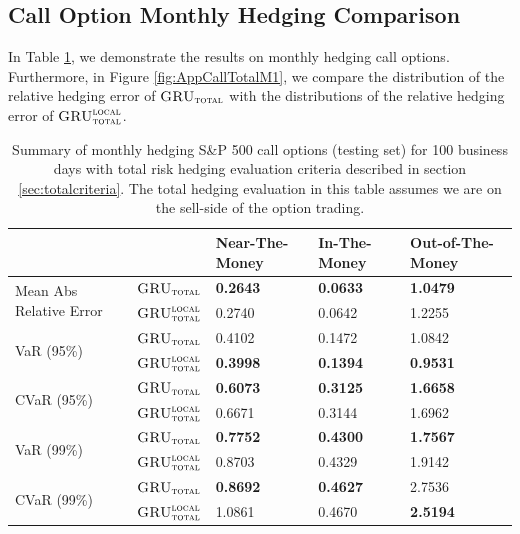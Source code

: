 \documentclass[letterpaper,12pt,titlepage,oneside,final]{book}
\numberwithin{equation}{section}
\theoremstyle{definition}
\newcommand{\modelT}{\textsc{GRU}_{\textsc{total}}}
\newcommand{\modelL}{\textsc{GRU}_{\textsc{total}}^{\textsc{local}}}
\begin{document}
\subsection{Call Option Monthly Hedging Comparison}
In Table \ref{table:AppCallTotalM}, we demonstrate the results on monthly hedging call options. Furthermore, in Figure \ref{fig:AppCallTotalM1}, we compare the distribution of the relative hedging error of $\modelT$ with the distributions of the relative hedging error of $\modelL$.
\begin{table}[htp!]
	\centering
	\begin{tabular}{ll|l|l|l|}
		\cline{3-5}
		&          & Near-The-Money   & In-The-Money     & Out-of-The-Money \\ \hline
		\multicolumn{1}{|l|}{\multirow{2}{*}{Mean Abs Relative Error}} & $\modelT$    & \textbf{0.2643}  & \textbf{0.0633}  & \textbf{1.0479}           \\  
		\multicolumn{1}{|l|}{}                                & $\modelL$    & 0.2740           & 0.0642           & 1.2255           \\   \hline
		\multicolumn{1}{|l|}{\multirow{2}{*}{VaR (95\%)}}     & $\modelT$    & 0.4102          & 0.1472          & 1.0842          \\  
		\multicolumn{1}{|l|}{}                                & $\modelL$    & \textbf{0.3998} & \textbf{0.1394} & \textbf{0.9531} \\  \hline
		\multicolumn{1}{|l|}{\multirow{2}{*}{CVaR (95\%)}}    & $\modelT$    & \textbf{0.6073} & \textbf{0.3125} & \textbf{1.6658} \\  
		\multicolumn{1}{|l|}{}                                & $\modelL$    & 0.6671          & 0.3144          & 1.6962          \\   \hline
		\multicolumn{1}{|l|}{\multirow{2}{*}{VaR (99\%)}}     & $\modelT$    & \textbf{0.7752}          & \textbf{0.4300} & \textbf{1.7567} \\  
		\multicolumn{1}{|l|}{}                                & $\modelL$    & 0.8703          & 0.4329          & 1.9142          \\   \hline
		\multicolumn{1}{|l|}{\multirow{2}{*}{CVaR (99\%)}}    & $\modelT$    & \textbf{0.8692}          & \textbf{0.4627} & 2.7536          \\  
		\multicolumn{1}{|l|}{}                                & $\modelL$    & 1.0861          & 0.4670          & \textbf{2.5194} \\   \hline
	\end{tabular}
	\caption{Summary of monthly hedging S\&P 500 call options (testing set) for 100 business days with total risk hedging evaluation criteria described in  section \ref{sec:totalcriteria}. The total hedging evaluation in this table assumes we are on the sell-side of the option trading.} \label{table:AppCallTotalM}
\end{table}
\end{document}
